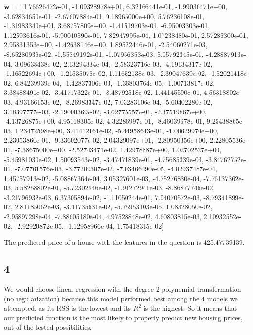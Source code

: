 \documentclass[leqno]{article}
\begin{document}
\noindent \textbf{w} = [ 1.76626472e-01, -1.09328978e+01,  6.32166441e-01, -1.99036471e+00, -3.62834650e-01, -2.67607884e-01,  9.18965000e+00,  5.76236108e-01, -1.31983340e+01,  3.68757809e+00, -1.41519703e-01, -6.95003303e-01,  1.12593616e-01, -5.90040590e-01,  7.82947995e-04,  1.07238480e-01,  2.57285300e-01,  2.95831353e+00, -1.42638146e+00,  1.89522446e-01, -2.54060271e-03, -8.65280936e-02, -1.55349192e-01, -1.07956353e-03,  5.05792345e-01, -4.28887913e-04,  3.09638438e-02,  2.13294334e-04, -2.58323716e-03, -4.19134317e-02, -1.16522694e+00, -1.21535076e-02,  1.11652138e-03, -2.39047639e-02, -1.52021418e-02,  6.84239939e-04, -1.42837306e-03, -1.36803764e-05, -1.00713817e-02,  3.38488491e-02, -3.41717322e-01, -8.48792518e-02,  1.44145590e-01,  4.56318802e-03,  4.93166153e-02, -8.26983347e-02,  7.03283106e-04, -5.60402280e-02,  3.18397777e-03, -2.19000369e-02, -3.62775557e-01, -2.37519867e+00, -4.13726875e+00,  4.95118305e-02,  4.32286997e-01, -8.46039678e-01,  9.25438865e-03,  1.23472598e+00,  3.41412161e-02, -5.44958643e-01, -1.00629970e+00,  2.23053860e-01, -9.33602077e-02,  2.04329097e+01, -2.80950356e+00,  2.22805536e-01, -7.38675000e+00, -2.52743471e-02,  1.42978887e+00,  1.02702527e+00, -5.45981030e-02,  1.50093543e-02, -3.47471839e-01, -4.75685339e-03, -3.84762752e-01, -7.07761576e-03, -3.77209307e-02, -7.03466490e-05, -4.02937487e-04,  1.45757913e-02, -5.08867364e-04,  3.05327601e-03, -4.75276830e-04, -7.75137362e-03,  5.58258802e-01, -5.72302846e-02, -1.91272941e-03, -8.86877746e-02, -3.21796932e-03,  6.37305894e-02, -1.11050244e-01,  7.94070572e-03, -8.79341899e-02,  2.81185062e-03, -3.41735631e-02, -5.75953103e-05,  1.08328050e-02, -2.95897298e-04, -7.88605180e-04,  4.97528848e-02,  4.60803815e-03,  2.10932552e-02, -2.92920872e-05, -1.12958966e-04,  1.75418315e-02]

\noindent The predicted price of a house with the features in the question is 425.47739139. 

\subsection*{4} We would choose linear regression with the degree 2 polynomial transformation (no regularization) because this model 
performed best among the 4 models we attempted, as its RSS is the lowest and its $R^2$ is the highest. So it
means that our predicted function is the most likely to properly predict new housing prices, out of the tested possibilities. 

\hfill
\end{document}
